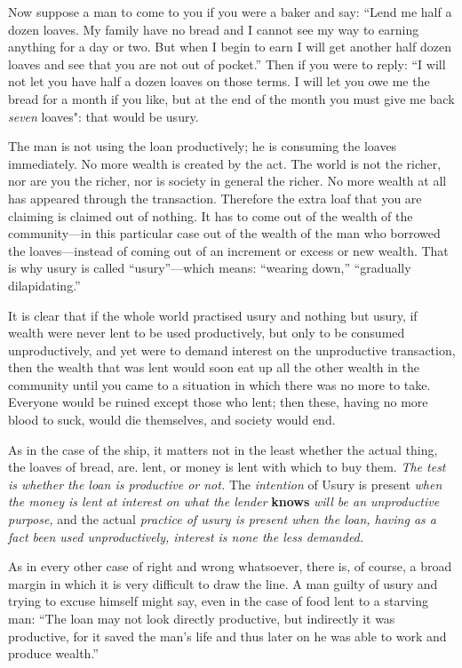 \documentclass{book}
\begin{document}
Now suppose a man to come to you if you were a baker and say: “Lend me half a dozen loaves. My family have no bread and I cannot see my way to earning anything for a day or two. But when I begin to earn I will get another half dozen loaves and see that you are not out of pocket.” Then if you were to reply: “I will not let you have half a dozen loaves on those terms. I will let you owe me the bread for a month if you like, but at the end of the month you must give me back \emph{seven} loaves": that would be usury.

The man is not using the loan productively; he is consuming the loaves immediately. No more wealth is created by the act. The world is not the richer, nor are you the richer, nor is society in general the richer. No more wealth at all has appeared through the transaction. Therefore the extra loaf that you are claiming is claimed out of nothing. It has to come out of the wealth of the community—in this particular case out of the wealth of the man who borrowed the loaves—instead of coming out of an increment or excess or new wealth. That is why usury is called “usury”—which means: “wearing down,” “gradually dilapidating.”

It is clear that if the whole world practised usury and nothing but usury, if wealth were never lent to be used productively, but only to be consumed unproductively, and yet were to demand interest on the unproductive transaction, then the wealth that was lent would soon eat up all the other wealth in the community until you came to a situation in which there was no more to take. Everyone would be ruined except those who lent; then these, having no more blood to suck, would die themselves, and society would end.

As in the case of the ship, it matters not in the least whether the actual thing, the loaves of bread, are. lent, or money is lent with which to buy them. \emph{The test is whether the loan is productive or not.} The \emph{intention} of Usury is present \emph{when the money is lent at interest on what the lender} \textbf{knows} \emph{will be an unproductive purpose,} and the actual \emph{practice of usury is present when the loan, having as a fact been used unproductively, interest is none the less demanded.}

As in every other case of right and wrong whatsoever, there is, of course, a broad margin in which it is very difficult to draw the line. A man guilty of usury and trying to excuse himself might say, even in the case of food lent to a starving man: “The loan may not look directly productive, but indirectly it was productive, for it saved the man’s life and thus later on he was able to work and produce wealth.”
\end{document}
